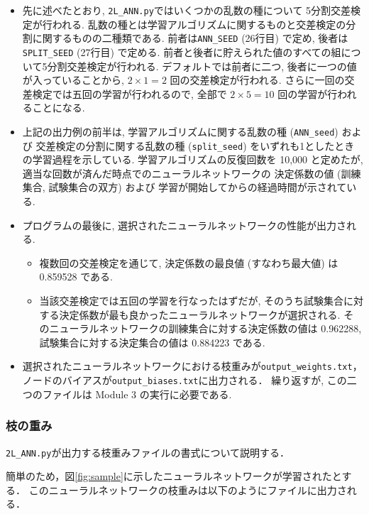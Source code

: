 \documentclass[11pt, titlepage, dvipdfmx, twoside]{jarticle}
\newcommand{\figref}[1]{図\ref{fig:#1}}
\begin{document}
\begin{itemize}
\item 先に述べたとおり, \verb|2L_ANN.py|ではいくつかの乱数の種について
5分割交差検定が行われる. 
乱数の種とは学習アルゴリズムに関するものと交差検定の分割に関するものの二種類である. 
前者は\verb|ANN_SEED| (26行目) で定め,
後者は\verb|SPLIT_SEED| (27行目) で定める. 
前者と後者に貯えられた値のすべての組について5分割交差検定が行われる. 
デフォルトでは前者に二つ, 後者に一つの値が入っていることから, 
$2\times 1=2$ 回の交差検定が行われる. 
さらに一回の交差検定では五回の学習が行われるので, 
全部で $2\times 5=10$
回の学習が行われることになる. 

\item 上記の出力例の前半は,
 学習アルゴリズムに関する乱数の種 (\verb|ANN_seed|) および
 交差検定の分割に関する乱数の種 (\verb|split_seed|) をいずれも1としたときの学習過程を示している. 
 学習アルゴリズムの反復回数を 10,000 と定めたが, 
 適当な回数が済んだ時点でのニューラルネットワークの
 決定係数の値 (訓練集合, 試験集合の双方) および
 学習が開始してからの経過時間が示されている.  

\item プログラムの最後に, 選択されたニューラルネットワークの性能が出力される. 
\begin{itemize}
\item 複数回の交差検定を通じて, 決定係数の最良値 (すなわち最大値) は 0.859528 である.
\item 当該交差検定では五回の学習を行なったはずだが, 
そのうち試験集合に対する決定係数が最も良かったニューラルネットワークが選択される. 
そのニューラルネットワークの訓練集合に対する決定係数の値は 0.962288, 
試験集合に対する決定集合の値は 0.884223 である. 
\end{itemize}

\item 選択されたニューラルネットワークにおける枝重みが\verb|output_weights.txt|，
ノードのバイアスが\verb|output_biases.txt|に出力される．
繰り返すが, この二つのファイルは Module 3 の実行に必要である. 
\end{itemize}


\subsubsection{枝の重み}
\verb|2L_ANN.py|が出力する枝重みファイルの書式について説明する．

簡単のため，\figref{sample}に示したニューラルネットワークが学習されたとする．
このニューラルネットワークの枝重みは以下のようにファイルに出力される．
\end{document}
